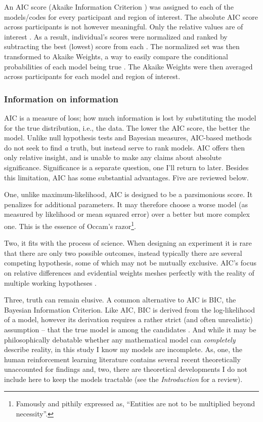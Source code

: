 An AIC score (Akaike Information Criterion \cite{Akaike:1974p9530}) was assigned to each of the models/codes for every participant and region of interest.  The absolute AIC score across participants is not however meaningful.  Only the relative values are of interest \cite{Wagenmakers:2004p9472}.  As a result, individual's scores were normalized and ranked by subtracting the best (lowest) score from each \cite{Anderson:2000p9475}. The normalized set was then transformed to Akaike Weights, a way to easily compare the conditional probabilities of each model being true \cite{Wagenmakers:2004p9472}.  The Akaike Weights were then averaged across participants for each model and region of interest.

\subsubsection{Information on information}
\label{subsub:way}
AIC is a measure of loss; how much information is lost by substituting the model for the true distribution, i.e., the data.  The lower the AIC score, the better the model.  Unlike null hypothesis tests and Bayesian measures, AIC-based methods do not seek to find \emph{a} truth, but instead serve to rank models.  AIC offers then only relative insight, and is unable to make any claims about absolute significance.  Significance is a separate question, one I'll return to later.  Besides this limitation, AIC has some substantial advantages. Five are reviewed below.

One, unlike maximum-likelihood, AIC is designed to be a parsimonious score.  It penalizes for additional parameters.  It may therefore choose a worse model (as measured by likelihood or mean squared error) over a better but more complex one. This is the essence of Occam's razor\footnote{Famously and pithily expressed as, ``Entities are not to be multiplied beyond necessity''.}. 

Two, it fits with the process of science.  When designing an experiment it is rare that there are only two possible outcomes, instead typically there are several competing hypothesis, some of which may not be mutually exclusive.  AIC's focus on relative differences and evidential weights meshes perfectly with the reality of multiple working hypotheses \cite{Burnham:2004p9621}.

Three, truth can remain elusive.  A common alternative to AIC is BIC, the Bayesian Information Criterion.  Like AIC, BIC is derived from the log-likelihood of a model, however its derivation requires a rather strict (and often unrealistic) assumption -- that the true model is among the candidates \cite{Forster:2000p9623}.  And while it may be philosophically debatable whether any mathematical model can \emph{completely} describe reality, in this study I know my models are incomplete.  As, one, the human reinforcement learning literature contains several recent theoretically unaccounted for findings and, two, there are theoretical developments I do not include here to keep the models tractable (see the \emph{Introduction} for a review).  

